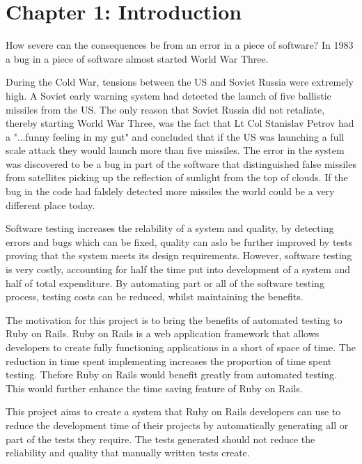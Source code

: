 \documentclass[a4paper,12pt]{article}
\begin{document}
\newpage
\tableofcontents

\newpage	
{}
\section{Chapter 1: Introduction}

\par How severe can the consequences be from an error in a piece of software? In 1983 a bug in a piece of software almost started World War Three.
\vspace{5mm}
\par During the Cold War, tensions between the US and Soviet Russia were extremely high. A Soviet early warning system had detected the launch of five ballistic missiles from the US. The only reason that Soviet Russia did not retaliate, thereby starting World War Three, was the fact that Lt Col Stanislav Petrov had a "...funny feeling in my gut"\cite{ZDNetDisasters} and concluded that if the US was launching a full scale attack they would launch more than five missiles. The error in the system was discovered to be a bug in part of the software that distinguished false missiles from satellites picking up the reflection of sunlight from the top of clouds.\cite{ZDNetDisasters} If the bug in the code had falslely detected more missiles the world could be a very different place today.
\vspace{5mm}
\par Software testing increases the relability of a system and quality, by detecting errors and bugs which can be fixed, quality can aslo be further improved by tests proving that the system meets its design requirements. However, software testing is very costly, accounting for half the time put into development of a system and half of total expenditure.\cite{myers2011art} By automating part or all of the software testing process, testing costs can be reduced, whilst maintaining the benefits.
\vspace{5mm}
\par The motivation for this project is to bring the benefits of automated testing to Ruby on Rails. Ruby on Rails is a web application framework that allows developers to create fully functioning applications in a short of space of time. The reduction in time spent implementing increases the proportion of time spent testing. Thefore Ruby on Rails would benefit greatly from automated testing. This would further enhance the time saving feature of Ruby on Rails.
\vspace{5mm}
\par This project aims to create a system that Ruby on Rails developers can use to reduce the development time of their projects by automatically generating all or part of the tests they require. The tests generated should not reduce the reliability and quality that manually written tests create.
\end{document}

